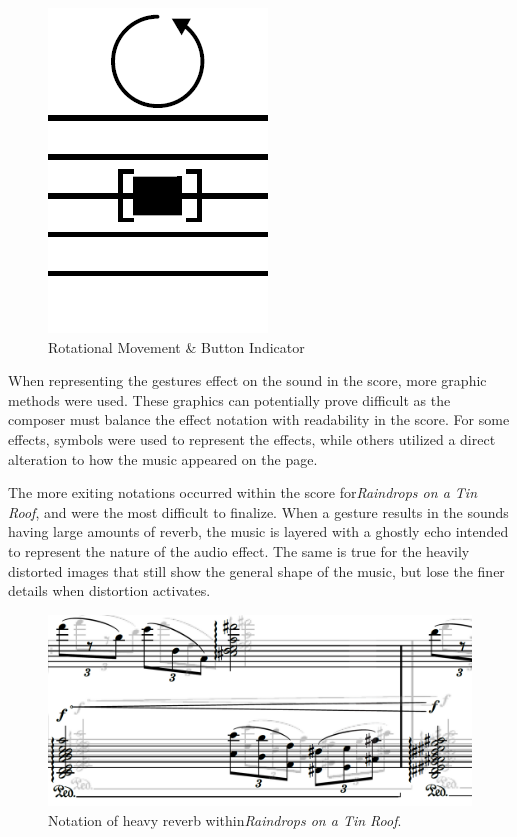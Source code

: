 \begin{figure}
    \centering
    \includegraphics{trigger.png}
    \caption{Rotational Movement \& Button Indicator}
    \label{fig:rotateMovement}
\end{figure}


When representing the gestures effect on the sound in the score, more graphic methods were used. These graphics can potentially prove difficult as the composer must balance the effect notation with readability in the score. For some effects, symbols were used to represent the effects, while others utilized a direct alteration to how the music appeared on the page.

The more exiting notations occurred within the score for\textit{Raindrops on a Tin Roof}, and were the most difficult to finalize. When a gesture results in the sounds having large amounts of reverb, the music is layered with a ghostly echo intended to represent the nature of the audio effect. The same is true for the heavily distorted images that still show the general shape of the music, but lose the finer details when distortion activates.

\begin{figure}
    \centering
    \includegraphics[scale=0.5]{verbbb.png}
    \caption{Notation of heavy reverb within\textit{Raindrops on a Tin Roof}.}
    \label{fig:verbbb}
\end{figure}

